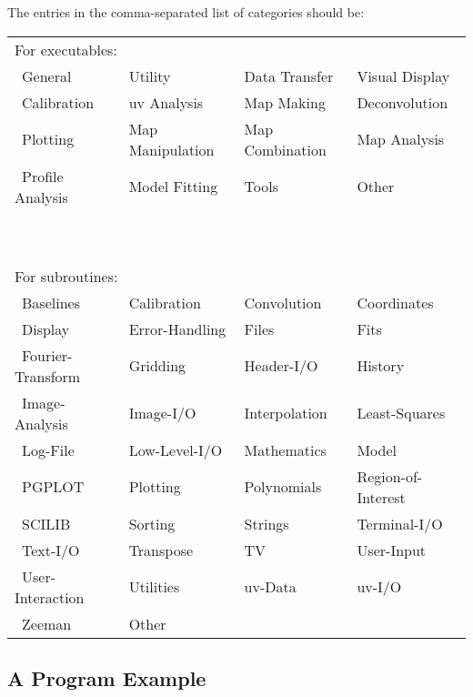 \documentclass{report}
\begin{document}
The entries in the comma-separated list of categories should be:
\begin{center}
\begin{tabular}{llll}
\multicolumn{4}{l}{For executables:}\\
\ General             &Utility             &Data Transfer       &Visual Display\\
\ Calibration         &uv Analysis         &Map Making          &Deconvolution\\
\ Plotting            &Map Manipulation    &Map Combination     &Map Analysis\\
\ Profile Analysis    &Model Fitting       &Tools               &Other\\
\multicolumn{4}{l}{\ }\\
\multicolumn{4}{l}{\ }\\
\multicolumn{4}{l}{For subroutines:}\\
\ Baselines           &Calibration         &Convolution         &Coordinates\\
\ Display             &Error-Handling      &Files               &Fits\\
\ Fourier-Transform   &Gridding            &Header-I/O          &History\\
\ Image-Analysis      &Image-I/O           &Interpolation       &Least-Squares\\
\ Log-File            &Low-Level-I/O       &Mathematics         &Model\\
\ PGPLOT              &Plotting            &Polynomials         &Region-of-Interest\\
\ SCILIB              &Sorting             &Strings             &Terminal-I/O\\
\ Text-I/O            &Transpose           &TV                  &User-Input\\
\ User-Interaction    &Utilities           &uv-Data             &uv-I/O\\
\ Zeeman              &Other               &                    & \\
\end{tabular}
\end{center}

\subsection*{A Program Example}
\end{document}
